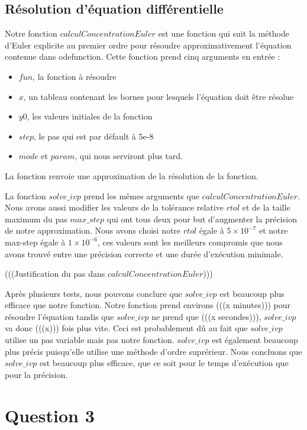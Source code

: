 \documentclass[11pt]{report}
\newcommand{\mychapter}[2]{
    \setcounter{chapter}{#1}
    \setcounter{section}{0}
    \chapter*{#2}
    \addcontentsline{toc}{chapter}{#2}
}
\begin{document}
        \section{Résolution d'équation différentielle}
            Notre fonction $calculConcentrationEuler$ est une fonction qui suit la méthode d'Euler explicite au premier ordre
            pour résoudre approximativement l'équation contenue dans odefunction.
            Cette fonction prend cinq arguments en entrée :
            \begin{itemize}
                \item $fun$, la fonction à résoudre
                \item $x$, un tableau contenant les bornes pour lesquels l'équation doit être résolue
                \item $y0$, les valeurs initiales de la fonction
                \item $step$, le pas qui est par défault à 5e-8
                \item $mode$ et $param$, qui nous serviront plus tard.
            \end{itemize}
            La fonction renvoie une approximation de la résolution de la fonction.
            \par
            La fonction $solve\_ivp$ prend les mêmes arguments que $calculConcentrationEuler$. 
            Nous avons aussi modifier les valeurs de la tolérance relative $rtol$ et de la taille maximum du pas $max\_step$
            qui ont tous deux pour but d'augmenter la précision de notre approximation.
            Nous avons choisi notre $rtol$ égale à $5\times10^{-7}$ et notre max-step égale à $1\times10^{-6}$,
            ces valeurs sont les meilleurs compromis que nous avons trouvé entre une précision correcte
            et une durée d'exécution minimale.
            \par
            (((Justification du pas dans $calculConcentrationEuler$)))
            \par
            Après plusieurs tests, nous pouvons conclure que $solve\_ivp$ est beaucoup plus efficace que notre fonction.
            Notre fonction prend environs (((x minutes))) pour résoudre l'équation tandis que $solve\_ivp$ ne prend que (((x secondes))),
            $solve\_ivp$ va donc (((x))) fois plus vite.
            Ceci est probablement dû au fait que $solve\_ivp$ utilise un pas variable mais pas notre fonction.
            $solve\_ivp$ est également beaucoup plus précis puisqu'elle utilise une méthode d'ordre suprérieur.
            Nous concluons que $solve\_ivp$ est beaucoup plus efficace, que ce soit pour le temps d'exécution que pour la précision.
    \mychapter{3}{Question 3}
\end{document}
